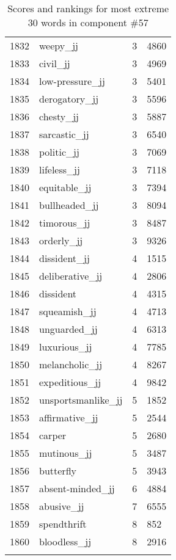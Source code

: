\begin{longtable}[!htbp]{| rlr@{.}l |}
    1832 & weepy\_jj & 3 & 4860 \\
    1833 & civil\_jj & 3 & 4969 \\
    1834 & low-pressure\_jj & 3 & 5401 \\
    1835 & derogatory\_jj & 3 & 5596 \\
    1836 & chesty\_jj & 3 & 5887 \\
    1837 & sarcastic\_jj & 3 & 6540 \\
    1838 & politic\_jj & 3 & 7069 \\
    1839 & lifeless\_jj & 3 & 7118 \\
    1840 & equitable\_jj & 3 & 7394 \\
    1841 & bullheaded\_jj & 3 & 8094 \\
    1842 & timorous\_jj & 3 & 8487 \\
    1843 & orderly\_jj & 3 & 9326 \\
    1844 & dissident\_jj & 4 & 1515 \\
    1845 & deliberative\_jj & 4 & 2806 \\
    1846 & dissident & 4 & 4315 \\
    1847 & squeamish\_jj & 4 & 4713 \\
    1848 & unguarded\_jj & 4 & 6313 \\
    1849 & luxurious\_jj & 4 & 7785 \\
    1850 & melancholic\_jj & 4 & 8267 \\
    1851 & expeditious\_jj & 4 & 9842 \\
    1852 & unsportsmanlike\_jj & 5 & 1852 \\
    1853 & affirmative\_jj & 5 & 2544 \\
    1854 & carper & 5 & 2680 \\
    1855 & mutinous\_jj & 5 & 3487 \\
    1856 & butterfly & 5 & 3943 \\
    1857 & absent-minded\_jj & 6 & 4884 \\
    1858 & abusive\_jj & 7 & 6555 \\
    1859 & spendthrift & 8 & 852 \\
    1860 & bloodless\_jj & 8 & 2916 \\
    \hline
    \caption{Scores and rankings for most extreme 30 words in component \#57} \\
\end{longtable}
